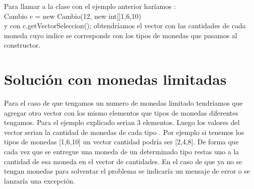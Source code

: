 	
	Para llamar a la clase con el ejemplo anterior haríamos :\\
	
	Cambio c = new Cambio(12, new int[]{1,6,10}) \\
	
	y con c.getVectorSeleccion(); obtendríamos el vector con las cantidades de cada moneda cuyo indice se corresponde con los tipos de monedas que pasamos al constructor.
	
	
	\section[Solución con monedas limitadas]{Solución con monedas limitadas}
	
	
	Para el caso de que tengamos un numero de monedas limitado tendríamos que agregar otro vector con los mismo elementos que tipos de monedas diferentes tengamos. Para el ejemplo explicado serian 3 elementos. Luego los valores del vector serian la cantidad de monedas de cada tipo . Por ejemplo si tenemos los tipos de monedas [1,6,10] un vector cantidad podría ser [2,4,8]. De forma que cada vez que se entregue una moneda de un determinado tipo restas uno a la cantidad de esa moneda en el vector de cantidades. En el caso de que ya no se tengan monedas para solventar el problema se indicaría un mensaje de error o se lanzaría una excepción. 



	


